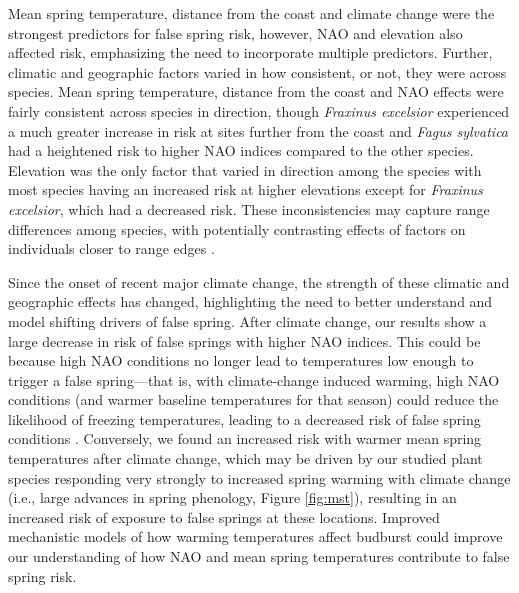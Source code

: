 \documentclass{article}\usepackage[]{graphicx}\usepackage[]{color}
\begin{document}
Mean spring temperature, distance from the coast and climate change were the strongest predictors for false spring risk, however, NAO and elevation also affected risk, emphasizing the need to incorporate multiple predictors. Further, climatic and geographic factors varied in how consistent, or not, they were across species. Mean spring temperature, distance from the coast and NAO effects were fairly consistent across species in direction, though \textit{Fraxinus excelsior} experienced a much greater increase in risk at sites further from the coast and \textit{Fagus sylvatica} had a heightened risk to higher NAO indices compared to the other species. Elevation was the only factor that varied in direction among the species with most species having an increased risk at higher elevations except for \textit{Fraxinus excelsior}, which had a decreased risk. These inconsistencies may capture range differences among species, with potentially contrasting effects of factors on individuals closer to range edges \citep{Chuine2008}. 

Since the onset of recent major climate change, the strength of these climatic and geographic effects has changed, highlighting the need to better understand and model shifting drivers of false spring. After climate change, our results show a large decrease in risk of false springs with higher NAO indices. This could be because high NAO conditions no longer lead to temperatures low enough to trigger a false spring---that is, with climate-change induced warming, high NAO conditions (and warmer baseline temperatures for that season) could reduce the likelihood of freezing temperatures, leading to a decreased risk of false spring conditions \citep{Screen2017}. Conversely, we found an increased risk with warmer mean spring temperatures after climate change, which may be driven by our studied plant species responding very strongly to increased spring warming with climate change (i.e., large advances in spring phenology, Figure \ref{fig:mst}), resulting in an increased risk of exposure to false springs at these locations. Improved mechanistic models of how warming temperatures affect budburst \citep{Chuine2016,Gauzere2017,Gauzere2019} could improve our understanding of how NAO and mean spring temperatures contribute to false spring risk.  
\end{document}
